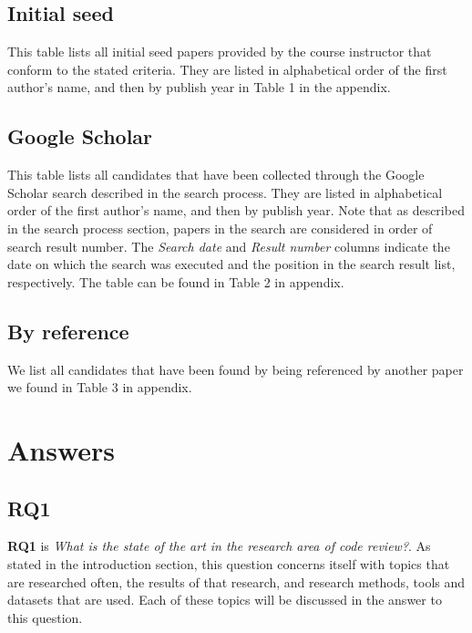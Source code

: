 \documentclass[]{book}
\begin{document}
\subsection{Initial seed}\label{initial-seed-1}

This table lists all initial seed papers provided by the course
instructor that conform to the stated criteria. They are listed in
alphabetical order of the first author's name, and then by publish year
in Table 1 in the appendix.

\subsection{Google Scholar}\label{google-scholar}

This table lists all candidates that have been collected through the
Google Scholar search described in the search process. They are listed
in alphabetical order of the first author's name, and then by publish
year. Note that as described in the search process section, papers in
the search are considered in order of search result number. The
\emph{Search date} and \emph{Result number} columns indicate the date on
which the search was executed and the position in the search result
list, respectively. The table can be found in Table 2 in appendix.

\subsection{By reference}\label{by-reference}

We list all candidates that have been found by being referenced by
another paper we found in Table 3 in appendix.

\section{Answers}\label{answers-4}

\subsection{RQ1}\label{rq1}

\textbf{RQ1} is \emph{What is the state of the art in the research area
of code review?}. As stated in the introduction section, this question
concerns itself with topics that are researched often, the results of
that research, and research methods, tools and datasets that are used.
Each of these topics will be discussed in the answer to this question.
\end{document}
